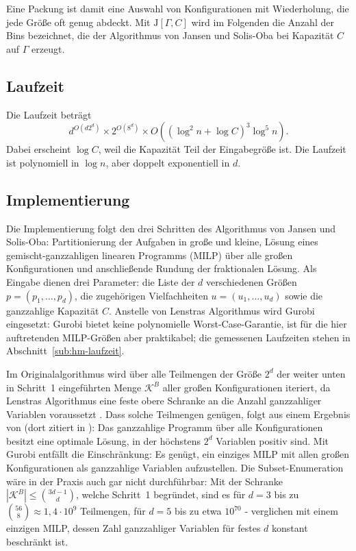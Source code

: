 \noindent
Eine Packung ist damit eine Auswahl von Konfigurationen mit Wiederholung, die jede Größe oft genug abdeckt.
Mit $\mathrm{J}[\Gamma, C]$ wird im Folgenden die Anzahl der Bins bezeichnet, die der Algorithmus von Jansen und Solis-Oba bei Kapazität $C$ auf $\Gamma$ erzeugt.

\subsection{Laufzeit}
\label{sub:jansen-laufzeit}

Die Laufzeit beträgt \cite[Theorem~1.1]{jansen_solisoba2010}
\[
  d^{O(d2^d)} \times 2^{O(8^d)} \times O\!\left((\log^2 n + \log C)^3 \log^5 n\right).
\]
Dabei erscheint $\log C$, weil die Kapazität Teil der Eingabegröße ist.
Die Laufzeit ist polynomiell in $\log n$, aber doppelt exponentiell in $d$.

\subsection{Implementierung}
\label{sub:jansen-implementierung}

Die Implementierung folgt den drei Schritten des Algorithmus von Jansen und Solis-Oba:
Partitionierung der Aufgaben in große und kleine, Lösung eines gemischt-ganzzahligen linearen
Programms (MILP) über alle großen Konfigurationen und anschließende Rundung der fraktionalen
Lösung.
Als Eingabe dienen drei Parameter: die Liste der $d$ verschiedenen Größen $p = (p_1, \ldots, p_d)$,
die zugehörigen Vielfachheiten $u = (u_1, \ldots, u_d)$ sowie die ganzzahlige Kapazität $C$.
Anstelle von Lenstras Algorithmus \cite{lenstra1983} wird Gurobi eingesetzt:
Gurobi bietet keine polynomielle Worst-Case-Garantie, ist für die hier auftretenden
MILP-Größen aber praktikabel; die gemessenen Laufzeiten stehen in
Abschnitt~\ref{sub:hm-laufzeit}.

Im Originalalgorithmus wird über alle Teilmengen der Größe $2^d$ der weiter unten in Schritt~1
eingeführten Menge $\mathcal{K}^B$ aller großen Konfigurationen iteriert,
da Lenstras Algorithmus eine feste obere Schranke an die Anzahl ganzzahliger Variablen voraussetzt
\cite{jansen_solisoba2010}.
Dass solche Teilmengen genügen, folgt aus einem Ergebnis von \textcite{eisenbrand_shmonin2006}
(dort zitiert in \cite{jansen_solisoba2010}): Das ganzzahlige Programm über alle Konfigurationen
besitzt eine optimale Lösung, in der höchstens $2^d$ Variablen positiv sind.
Mit Gurobi entfällt die Einschränkung: Es genügt, ein einziges MILP mit allen großen Konfigurationen
als ganzzahlige Variablen aufzustellen.
Die Subset-Enumeration wäre in der Praxis auch gar nicht durchführbar: Mit der Schranke
$|\mathcal{K}^B| \le \binom{3d-1}{d}$, welche Schritt~1 begründet, sind es für $d = 3$ bis zu
$\binom{56}{8} \approx 1{,}4 \cdot 10^{9}$ Teilmengen, für $d = 5$ bis zu etwa $10^{70}$ -
verglichen mit einem einzigen MILP, dessen Zahl ganzzahliger Variablen für festes $d$
konstant beschränkt ist.

